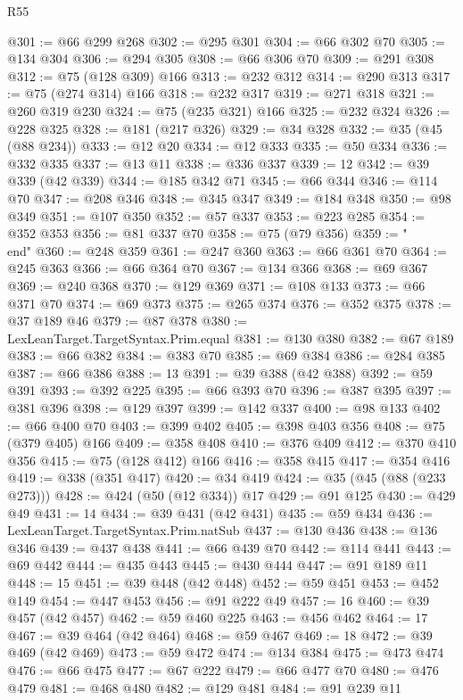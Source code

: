 \begin{lexlean}{R55}
\begin{coremodule}
@301 := @66 @299 @268
@302 := @295 @301
@304 := @66 @302 @70
@305 := @134 @304
@306 := @294 @305
@308 := @66 @306 @70
@309 := @291 @308
@312 := @75 (@128 @309) @166
@313 := @232 @312
@314 := @290 @313
@317 := @75 (@274 @314) @166
@318 := @232 @317
@319 := @271 @318
@321 := @260 @319 @230
@324 := @75 (@235 @321) @166
@325 := @232 @324
@326 := @228 @325
@328 := @181 (@217 @326)
@329 := @34 @328
@332 := @35 (@45 (@88 @234))
@333 := @12 @20
@334 := @12 @333
@335 := @50 @334
@336 := @332 @335
@337 := @13 @11
@338 := @336 @337
@339 := 12
@342 := @39 @339 (@42 @339)
@344 := @185 @342 @71
@345 := @66 @344
@346 := @114 @70
@347 := @208 @346
@348 := @345 @347
@349 := @184 @348
@350 := @98 @349
@351 := @107 @350
@352 := @57 @337
@353 := @223 @285
@354 := @352 @353
@356 := @81 @337 @70
@358 := @75 (@79 @356)
@359 := "\\end"
@360 := @248 @359
@361 := @247 @360
@363 := @66 @361 @70
@364 := @245 @363
@366 := @66 @364 @70
@367 := @134 @366
@368 := @69 @367
@369 := @240 @368
@370 := @129 @369
@371 := @108 @133
@373 := @66 @371 @70
@374 := @69 @373
@375 := @265 @374
@376 := @352 @375
@378 := @37 @189 @46
@379 := @87 @378
@380 := LexLeanTarget.TargetSyntax.Prim.equal
@381 := @130 @380
@382 := @67 @189
@383 := @66 @382
@384 := @383 @70
@385 := @69 @384
@386 := @284 @385
@387 := @66 @386
@388 := 13
@391 := @39 @388 (@42 @388)
@392 := @59 @391
@393 := @392 @225
@395 := @66 @393 @70
@396 := @387 @395
@397 := @381 @396
@398 := @129 @397
@399 := @142 @337
@400 := @98 @133
@402 := @66 @400 @70
@403 := @399 @402
@405 := @398 @403 @356
@408 := @75 (@379 @405) @166
@409 := @358 @408
@410 := @376 @409
@412 := @370 @410 @356
@415 := @75 (@128 @412) @166
@416 := @358 @415
@417 := @354 @416
@419 := @338 (@351 @417)
@420 := @34 @419
@424 := @35 (@45 (@88 (@233 @273)))
@428 := @424 (@50 (@12 @334)) @17
@429 := @91 @125
@430 := @429 @49
@431 := 14
@434 := @39 @431 (@42 @431)
@435 := @59 @434
@436 := LexLeanTarget.TargetSyntax.Prim.natSub
@437 := @130 @436
@438 := @136 @346
@439 := @437 @438
@441 := @66 @439 @70
@442 := @114 @441
@443 := @69 @442
@444 := @435 @443
@445 := @430 @444
@447 := @91 @189 @11
@448 := 15
@451 := @39 @448 (@42 @448)
@452 := @59 @451
@453 := @452 @149
@454 := @447 @453
@456 := @91 @222 @49
@457 := 16
@460 := @39 @457 (@42 @457)
@462 := @59 @460 @225
@463 := @456 @462
@464 := 17
@467 := @39 @464 (@42 @464)
@468 := @59 @467
@469 := 18
@472 := @39 @469 (@42 @469)
@473 := @59 @472
@474 := @134 @384
@475 := @473 @474
@476 := @66 @475
@477 := @67 @222
@479 := @66 @477 @70
@480 := @476 @479
@481 := @468 @480
@482 := @129 @481
@484 := @91 @239 @11

\end{coremodule}
\end{lexlean}
